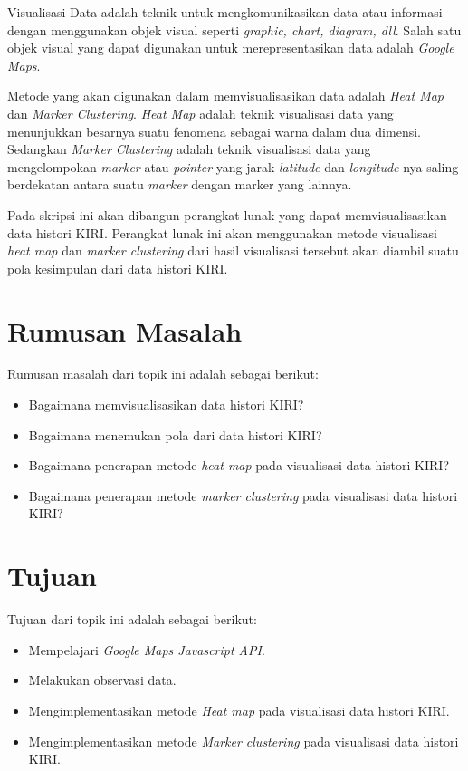 Visualisasi Data adalah teknik  untuk mengkomunikasikan data atau informasi dengan menggunakan objek visual  seperti \textit{graphic, chart, diagram, dll}. Salah satu objek visual yang dapat digunakan untuk merepresentasikan data adalah \textit{Google Maps}.

Metode yang akan digunakan dalam memvisualisasikan data adalah \textit{Heat Map} dan \textit{Marker Clustering}. \textit{Heat Map} adalah teknik visualisasi data yang menunjukkan besarnya suatu fenomena sebagai warna dalam dua dimensi. Sedangkan \textit{Marker Clustering}  adalah teknik visualisasi data  yang  mengelompokan \textit{marker} atau \textit{pointer} yang jarak \textit{latitude} dan \textit{longitude} nya saling berdekatan antara suatu \textit{marker} dengan marker yang lainnya.

Pada skripsi ini akan dibangun perangkat lunak yang dapat memvisualisasikan data histori KIRI. Perangkat lunak ini akan menggunakan metode visualisasi \textit{heat map} dan \textit{marker clustering} dari hasil visualisasi tersebut akan diambil suatu pola kesimpulan dari data histori KIRI.


\section{Rumusan Masalah}
\label{sec:rumusan}
Rumusan masalah dari topik ini adalah sebagai berikut:
\begin{itemize}
  \item Bagaimana memvisualisasikan data histori KIRI?
  \item Bagaimana menemukan pola dari data histori KIRI?
  \item Bagaimana penerapan metode \textit{heat map} pada visualisasi data histori KIRI?
  \item Bagaimana penerapan metode \textit{marker clustering} pada visualisasi data histori KIRI?


\end{itemize}

\section{Tujuan}
\label{sec:tujuan}
Tujuan dari topik ini adalah sebagai berikut:
\begin{itemize}
  \item Mempelajari \textit{Google Maps Javascript API}.
  \item Melakukan observasi data.
  \item Mengimplementasikan metode \textit{Heat map} pada visualisasi data histori KIRI.
  \item Mengimplementasikan metode \textit{Marker clustering} pada visualisasi data histori KIRI.


\end{itemize}

